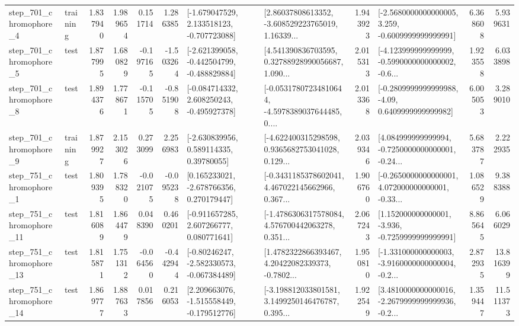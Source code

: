\begin{tabular}{llrrrrllrlrr}
   step\_701\_chromophore\_4 &  training &      1.837940 &    1.989654 &      0.151714 &  1.286385 &   [-1.679047529, 2.133518123, -0.707723088] &  [2.86037808613352, -3.608529223765019, 1.16339... &       1.943923 &  [-2.5680000000000005, 3.259, -0.6009999999999991] &            6.368608 &          5.939631 \\
   step\_701\_chromophore\_5 &      test &      1.877995 &    1.680829 &     -0.197165 & -1.503264 &  [-2.621399058, -0.442504799, -0.488829884] &  [4.541390836703595, 0.32788928990056687, 1.090... &       2.015313 &  [-4.123999999999999, -0.5990000000000002, -0.6... &            1.923558 &          6.033898 \\
   step\_701\_chromophore\_8 &      test &      1.894376 &    1.778671 &     -0.115705 & -0.851908 &   [-0.084714332, 2.608250243, -0.495927378] &  [-0.05317807234810644, -4.5978389037644485, 0.... &       2.013368 &   [-0.2809999999999988, -4.09, 0.6409999999999982] &            6.005053 &          3.289010 \\
   step\_701\_chromophore\_9 &  training &      1.879927 &    2.153026 &      0.273099 &  2.256983 &     [-2.630839956, 0.589114335, 0.39780055] &  [-4.622400315298598, 0.9365682753041028, 0.129... &       2.039346 &  [4.084999999999994, -0.7250000000000001, -0.24... &            5.683787 &          2.222935 \\
   step\_751\_chromophore\_1 &      test &      1.809395 &    1.788320 &     -0.021075 & -0.095238 &    [0.165233021, -2.678766356, 0.270179447] &  [-0.3431185378602041, 4.467022145662966, 0.367... &       1.906760 &  [-0.2650000000000001, 4.072000000000001, -0.33... &            1.086529 &          9.388388 \\
  step\_751\_chromophore\_11 &      test &      1.816089 &    1.864479 &      0.048390 &  0.460201 &    [-0.911657285, 2.607266777, 0.080771641] &  [-1.4786306317578084, 4.576700442063278, 0.351... &       2.067243 &   [1.152000000000001, -3.936, -0.7259999999999991] &            8.865645 &          6.066029 \\
  step\_751\_chromophore\_13 &      test &      1.815871 &    1.751312 &     -0.064560 & -0.442944 &   [-0.80246247, -2.582330573, -0.067384489] &  [1.4782322866393467, 4.20422082339373, -0.7802... &       1.950810 &  [-1.331000000000003, -3.9160000000000004, -0.2... &            2.872935 &         13.816399 \\
  step\_751\_chromophore\_14 &      test &      1.869777 &    1.887633 &      0.017856 &  0.216053 &   [2.209663076, -1.515558449, -0.179512776] &  [-3.198812033801581, 3.1499250146476787, 0.395... &       1.922549 &  [3.4810000000000016, -2.2679999999999936, -0.2... &            1.359447 &         11.511373 \\

\end{tabular}
